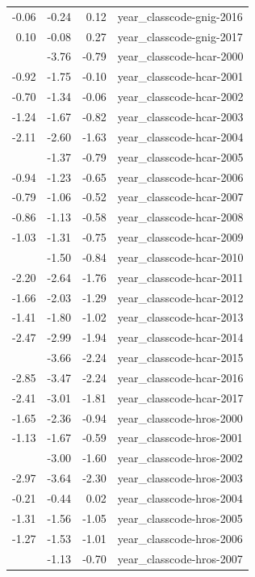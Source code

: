\documentclass[]{article}
\begin{document}
\begin{longtable}[t]{rrrl}
-0.06 & -0.24 & 0.12 & year\_classcode-gnig-2016\\
0.10 & -0.08 & 0.27 & year\_classcode-gnig-2017\\
\addlinespace
-2.28 & -3.76 & -0.79 & year\_classcode-hcar-2000\\
-0.92 & -1.75 & -0.10 & year\_classcode-hcar-2001\\
-0.70 & -1.34 & -0.06 & year\_classcode-hcar-2002\\
-1.24 & -1.67 & -0.82 & year\_classcode-hcar-2003\\
-2.11 & -2.60 & -1.63 & year\_classcode-hcar-2004\\
\addlinespace
-1.08 & -1.37 & -0.79 & year\_classcode-hcar-2005\\
-0.94 & -1.23 & -0.65 & year\_classcode-hcar-2006\\
-0.79 & -1.06 & -0.52 & year\_classcode-hcar-2007\\
-0.86 & -1.13 & -0.58 & year\_classcode-hcar-2008\\
-1.03 & -1.31 & -0.75 & year\_classcode-hcar-2009\\
\addlinespace
-1.17 & -1.50 & -0.84 & year\_classcode-hcar-2010\\
-2.20 & -2.64 & -1.76 & year\_classcode-hcar-2011\\
-1.66 & -2.03 & -1.29 & year\_classcode-hcar-2012\\
-1.41 & -1.80 & -1.02 & year\_classcode-hcar-2013\\
-2.47 & -2.99 & -1.94 & year\_classcode-hcar-2014\\
\addlinespace
-2.95 & -3.66 & -2.24 & year\_classcode-hcar-2015\\
-2.85 & -3.47 & -2.24 & year\_classcode-hcar-2016\\
-2.41 & -3.01 & -1.81 & year\_classcode-hcar-2017\\
-1.65 & -2.36 & -0.94 & year\_classcode-hros-2000\\
-1.13 & -1.67 & -0.59 & year\_classcode-hros-2001\\
\addlinespace
-2.30 & -3.00 & -1.60 & year\_classcode-hros-2002\\
-2.97 & -3.64 & -2.30 & year\_classcode-hros-2003\\
-0.21 & -0.44 & 0.02 & year\_classcode-hros-2004\\
-1.31 & -1.56 & -1.05 & year\_classcode-hros-2005\\
-1.27 & -1.53 & -1.01 & year\_classcode-hros-2006\\
\addlinespace
-0.91 & -1.13 & -0.70 & year\_classcode-hros-2007\\

\end{longtable}
\end{document}
